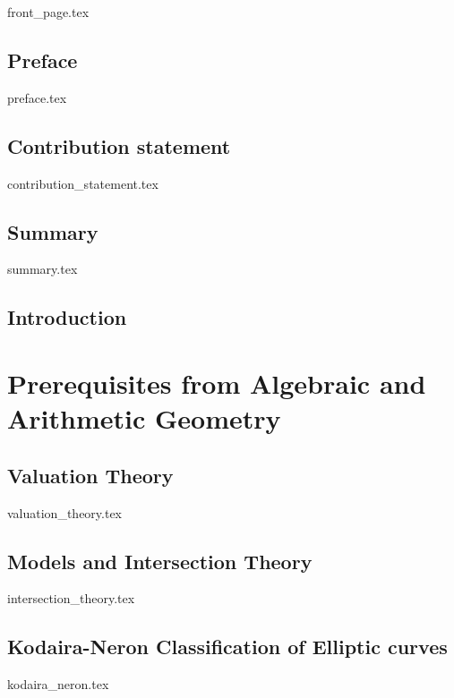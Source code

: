 


\rmfamily

\newpage
{front_page.tex}
\setcounter{page}{0}
\chapter*{Preface} \label{chap:preface}
{preface.tex}
\chapter*{Contribution statement} \label{chap:acknowledgements}
{contribution_statement.tex}
\chapter*{Summary} \label{chap:summary}
{summary.tex}

\myprintglossary
\myprintnomenclature
\listoftodos
\tableofcontents
\pagebreak
\setcounter{page}{0}

\chapter{Introduction} \label{chap:introduction}


\part{Prerequisites from Algebraic and Arithmetic Geometry}\label{part:AG}
\chapter{Valuation Theory} \label{chap:valuation_theory}
{valuation_theory.tex}



\chapter{Models and Intersection Theory} \label{chap:models_and_intersection_theory}
{intersection_theory.tex}

\chapter{Kodaira-Neron Classification of Elliptic curves} \label{chap:kodaira_neron_classification_of_elliptic_curves}
{kodaira_neron.tex}

